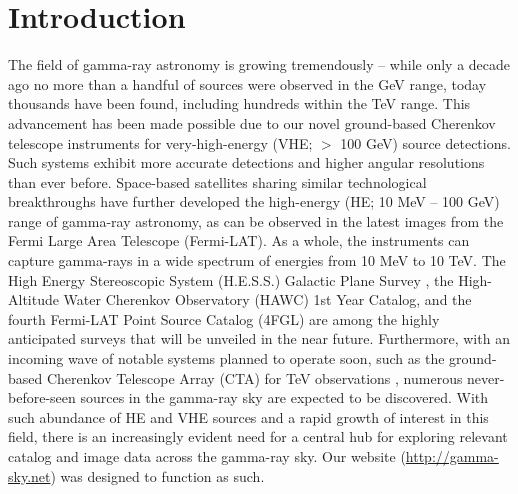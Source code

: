 \section{Introduction}

The field of gamma-ray astronomy is growing tremendously – while only a decade ago no more than a handful of sources were observed in the GeV range, today thousands have been found, including hundreds within the TeV range. This advancement has been made possible due to our novel ground-based Cherenkov telescope instruments for very-high-energy (VHE; $>$ 100 GeV) source detections. Such systems exhibit more accurate detections and higher angular resolutions than ever before. Space-based satellites sharing similar technological breakthroughs have further developed the high-energy (HE; 10 MeV -- 100 GeV) range of gamma-ray astronomy, as can be observed in the latest images from the Fermi Large Area Telescope (Fermi-LAT). As a whole, the instruments can capture gamma-rays in a wide spectrum of energies from 10 MeV to 10 TeV. The High Energy Stereoscopic System (H.E.S.S.) Galactic Plane Survey \cite{hgps}, the High-Altitude Water Cherenkov Observatory (HAWC) 1st Year Catalog, and the fourth Fermi-LAT Point Source Catalog (4FGL) are among the highly anticipated surveys that will be unveiled in the near future. Furthermore, with an incoming wave of notable systems planned to operate soon, such as the ground-based Cherenkov Telescope Array (CTA) for TeV observations \cite{cta}, numerous never-before-seen sources in the gamma-ray sky are expected to be discovered. With such abundance of HE and VHE sources and a rapid growth of interest in this field, there is an increasingly evident need for a central hub for exploring relevant catalog and image data across the gamma-ray sky. Our website (\url{http://gamma-sky.net}) was designed to function as such.
